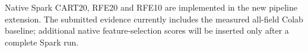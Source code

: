 Native Spark CART20, RFE20 and RFE10 are implemented in the new pipeline extension. The submitted evidence currently includes the measured all-field Colab baseline; additional native feature-selection scores will be inserted only after a complete Spark run.
